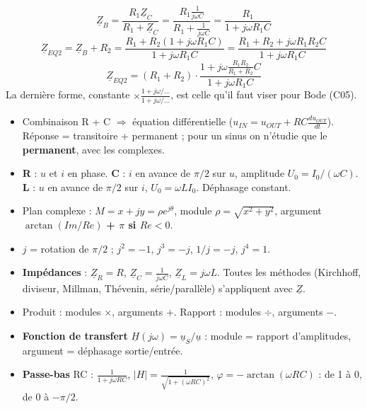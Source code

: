 \begin{exbox}[title={$\underline Z_{EQ2}$ : ($R_1$ parallèle C) en série avec $R_2$}]
\[ \underline Z_B = \frac{R_1\underline Z_C}{R_1 + \underline Z_C}
   = \frac{R_1\frac1{j\omega C}}{R_1 + \frac1{j\omega C}} = \frac{R_1}{1 + j\omega R_1C} \]
\[ \underline Z_{EQ2} = \underline Z_B + R_2 = \frac{R_1 + R_2(1 + j\omega R_1C)}{1 + j\omega R_1C}
   = \frac{R_1 + R_2 + j\omega R_1R_2C}{1 + j\omega R_1C} \]
\[ \underline Z_{EQ2} = (R_1 + R_2)\cdot\frac{1 + j\omega\frac{R_1R_2}{R_1+R_2}C}{1 + j\omega R_1C} \]
La dernière forme, \og constante $\times\frac{1 + j\omega/\ldots}{1 + j\omega/\ldots}$\fg{},
est celle qu'il faut viser pour Bode (C05).
\end{exbox}

\begin{recapbox}[title={Récap pour l'examen --- C04 : Impédances}]
\begin{itemize}
  \item Combinaison R + C $\Rightarrow$ équation différentielle
        ($u_{IN} = u_{OUT} + RC\frac{du_{OUT}}{dt}$). Réponse = transitoire + permanent ; pour
        un sinus on n'étudie que le \textbf{permanent}, avec les complexes.
  \item \textbf{R} : $u$ et $i$ en phase. \textbf{C} : $i$ en avance de $\pi/2$ sur $u$,
        amplitude $U_0 = I_0/(\omega C)$. \textbf{L} : $u$ en avance de $\pi/2$ sur $i$,
        $U_0 = \omega L I_0$. Déphasage constant.
  \item Plan complexe : $M = x + jy = \rho e^{j\theta}$, module $\rho = \sqrt{x^2+y^2}$,
        argument $\arctan(Im/Re)$ \textbf{+ $\pi$ si $Re<0$}.
  \item $j$ = rotation de $\pi/2$ ; $j^2 = -1$, $j^3 = -j$, $1/j = -j$, $j^4 = 1$.
  \item \textbf{Impédances} : $\underline Z_R = R$, $\underline Z_C = \frac1{j\omega C}$,
        $\underline Z_L = j\omega L$. Toutes les méthodes (Kirchhoff, diviseur, Millman,
        Thévenin, série/parallèle) s'appliquent avec $\underline Z$.
  \item Produit : modules $\times$, arguments $+$. Rapport : modules $\div$, arguments $-$.
  \item \textbf{Fonction de transfert} $\underline H(j\omega) = \underline u_S/\underline u$ :
        module = rapport d'amplitudes, argument = déphasage sortie/entrée.
  \item \textbf{Passe-bas} RC : $\frac1{1+j\omega RC}$, $|H| = \frac1{\sqrt{1+(\omega RC)^2}}$,
        $\varphi = -\arctan(\omega RC)$ : de 1 à 0, de $0$ à $-\pi/2$.

\end{itemize}
\end{recapbox}

